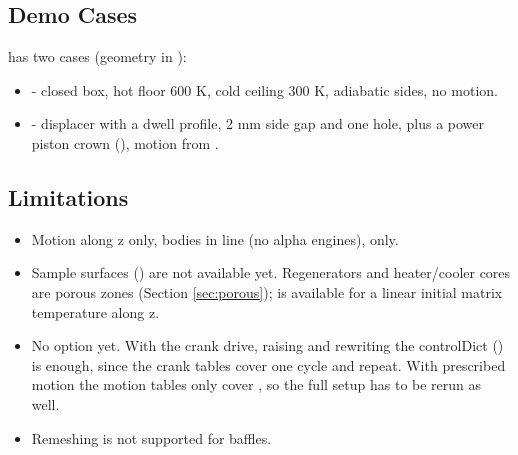 \subsection{Demo Cases}
 has two cases (geometry in ):
\begin{itemize}
    \item {} - closed box, hot floor 600 K, cold ceiling 300 K, adiabatic sides, no motion.
    \item {} - displacer with a dwell profile, 2 mm side gap and one hole, plus a power piston crown (), motion from .
\end{itemize}

\subsection{Limitations}
\begin{itemize}
    \item Motion along z only, bodies in line (no alpha engines),  only.
    \item Sample surfaces () are not available yet. Regenerators and heater/cooler cores are porous zones (Section \ref{sec:porous});  is available for a linear initial matrix temperature along z.
    \item No  option yet. With the crank drive, raising  and rewriting the controlDict () is enough, since the crank tables cover one cycle and repeat. With prescribed motion the motion tables only cover , so the full setup has to be rerun as well.
    \item Remeshing is not supported for  baffles.
\end{itemize}

